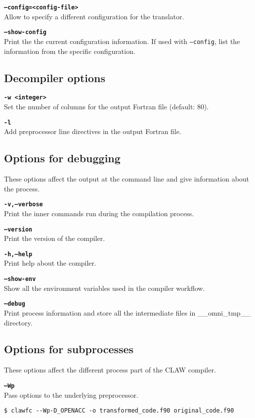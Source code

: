 \documentclass{article}
\begin{document}
\textbf{\texttt{--config=<config-file>}}\\
Allow to specify a different configuration for the translator.

\textbf{\texttt{--show-config}}\\
Print the the current configuration information. If used with \texttt{--config}, list the information from the specific configuration.

\subsection{Decompiler options}
\textbf{\texttt{-w <integer>}}\\
Set the number of columns for the output Fortran file (default: 80).

\textbf{\texttt{-l}}\\
Add preprocessor line directives in the output Fortran file.

\subsection{Options for debugging}
These options affect the output at the command line and give information about the process. 

\textbf{\texttt{-v,--verbose}}\\
Print the inner commands run during the compilation process. 

\textbf{\texttt{--version}}\\
Print the version of the compiler. 

\textbf{\texttt{-h,--help}}\\
Print help about the compiler. 

\textbf{\texttt{--show-env}}\\
Show all the environment variables used in the compiler workflow. 

\textbf{\texttt{--debug}}\\
Print process information and store all the intermediate files in \_\_omni\_tmp\_\_ directory. 

\subsection{Options for subprocesses}
These options affect the different process part of the CLAW compiler. 

\textbf{\texttt{--Wp}}\\
Pass options to the underlying preprocessor. 
\begin{lstlisting}
$ clawfc --Wp-D_OPENACC -o transformed_code.f90 original_code.f90
\end{lstlisting}
\end{document}
